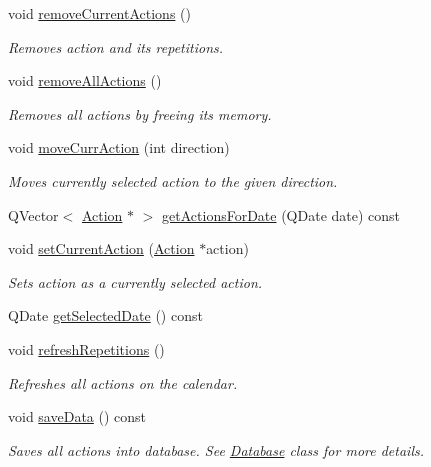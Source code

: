 \begin{DoxyCompactItemize}
void \hyperlink{class_actions_calendar_a0290e65eac7ce79a581ee57af1d0ec22}{remove\-Current\-Actions} ()
\begin{DoxyCompactList}\small\item\em Removes action and its repetitions. \end{DoxyCompactList}\item 
void \hyperlink{class_actions_calendar_ad21b5104f3a37e962c9d4e99fb7f3284}{remove\-All\-Actions} ()
\begin{DoxyCompactList}\small\item\em Removes all actions by freeing its memory. \end{DoxyCompactList}\item 
void \hyperlink{class_actions_calendar_aed09737705fecb2b97c9ce3b61668aca}{move\-Curr\-Action} (int direction)
\begin{DoxyCompactList}\small\item\em Moves currently selected action to the given direction. \end{DoxyCompactList}\item 
Q\-Vector$<$ \hyperlink{class_action}{Action} $\ast$ $>$ \hyperlink{class_actions_calendar_ac822864927d26b7b076ce15fc62ef3b8}{get\-Actions\-For\-Date} (Q\-Date date) const 
\item 
void \hyperlink{class_actions_calendar_a09cece9ef38174fb5c0abae9281a1a8c}{set\-Current\-Action} (\hyperlink{class_action}{Action} $\ast$action)
\begin{DoxyCompactList}\small\item\em Sets action as a currently selected action. \end{DoxyCompactList}\item 
Q\-Date \hyperlink{class_actions_calendar_abc02af256999b1f2a47e10224ae9f92d}{get\-Selected\-Date} () const 
\item 
void \hyperlink{class_actions_calendar_abf331faa70595856c2b6259bceea612e}{refresh\-Repetitions} ()
\begin{DoxyCompactList}\small\item\em Refreshes all actions on the calendar. \end{DoxyCompactList}\item 
void \hyperlink{class_actions_calendar_a3c7f468566f0110d27e55d61f7993836}{save\-Data} () const 
\begin{DoxyCompactList}\small\item\em Saves all actions into database. See \hyperlink{class_database}{Database} class for more details. \end{DoxyCompactList}\item 

\end{DoxyCompactItemize}
